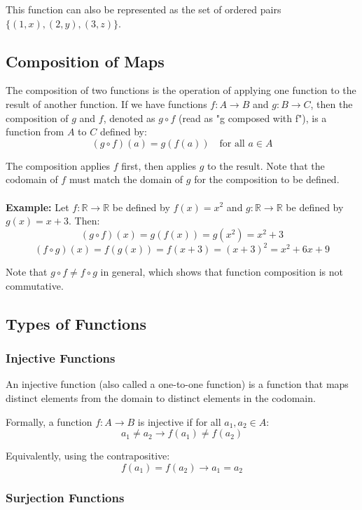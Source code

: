 This function can also be represented as the set of ordered pairs \(\{(1,x), (2,y), (3,z)\}\).

\subsection{Composition of Maps}
The composition of two functions is the operation of applying one function to the result of another function. If we have functions \(f: A \to B\) and \(g: B \rightarrow C\), then the composition of \(g\) and \(f\), denoted as \(g \circ f\) (read as "g composed with f"), is a function from \(A\) to \(C\) defined by:
\[
	(g \circ f)(a) = g(f(a)) \quad \text{for all } a \in A
\]

The composition applies \(f\) first, then applies \(g\) to the result. Note that the codomain of \(f\) must match the domain of \(g\) for the composition to be defined.
\\\\
\textbf{Example:} Let \(f: \mathbb{R} \to \mathbb{R}\) be defined by \(f(x) = x^2\) and \(g: \mathbb{R} \rightarrow \mathbb{R}\) be defined by \(g(x) = x+3\). Then:
\[
	(g \circ f)(x) = g(f(x)) = g(x^2) = x^2 + 3
\]
\[
	(f \circ g)(x) = f(g(x)) = f(x+3) = (x+3)^2 = x^2 + 6x + 9
\]

Note that \(g \circ f \neq f \circ g\) in general, which shows that function composition is not commutative.

\subsection{Types of Functions}

\subsubsection*{Injective Functions}

An injective function (also called a one-to-one function) is a function that maps distinct elements from the domain to distinct elements in the codomain.

Formally, a function \(f: A \to B\) is injective if for all \(a_1, a_2 \in A\):
\[
	a_1 \neq a_2 \to f(a_1) \neq f(a_2)
\]

Equivalently, using the contrapositive:
\[
	f(a_1) = f(a_2) \to a_1 = a_2
\]

\subsubsection*{Surjection Functions}

